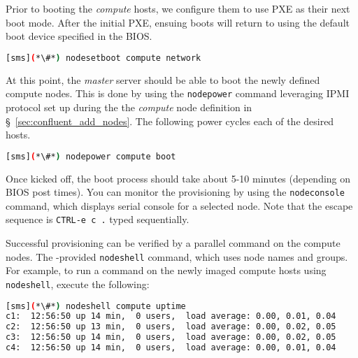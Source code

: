 Prior to booting the {\em compute} hosts, we configure them to use PXE as their
next boot mode. After the initial PXE, ensuing boots will return to using the default boot device
specified in the BIOS.

\begin{lstlisting}[language=bash,keywords={},upquote=true]
[sms](*\#*) nodesetboot compute network
\end{lstlisting}

At this point, the {\em master} server should be able to boot the newly defined
compute nodes. This is done by using the \texttt{nodepower} \Confluent{} command
leveraging IPMI protocol set up during the the {\em compute} node definition
in \S~\ref{sec:confluent_add_nodes}. The following power cycles each of the
desired hosts.


\begin{lstlisting}[language=bash,keywords={},upquote=true]
[sms](*\#*) nodepower compute boot
\end{lstlisting}

Once kicked off, the boot process should take about 5-10
minutes (depending on BIOS post times).  You can monitor the
provisioning by using the \texttt{nodeconsole} command, which displays serial console
for a selected node. Note that the escape sequence
is \texttt{CTRL-e c .} typed sequentially.

Successful provisioning can be verified by a parallel command on the compute
nodes. The \Confluent{}-provided
\texttt{nodeshell} command, which uses \Confluent{} node names and groups.  
For example, to run a command on
the newly imaged compute hosts using \texttt{nodeshell}, execute the following:

\begin{lstlisting}[language=bash]
[sms](*\#*) nodeshell compute uptime
c1:  12:56:50 up 14 min,  0 users,  load average: 0.00, 0.01, 0.04
c2:  12:56:50 up 13 min,  0 users,  load average: 0.00, 0.02, 0.05
c3:  12:56:50 up 14 min,  0 users,  load average: 0.00, 0.02, 0.05
c4:  12:56:50 up 14 min,  0 users,  load average: 0.00, 0.01, 0.04
\end{lstlisting}
